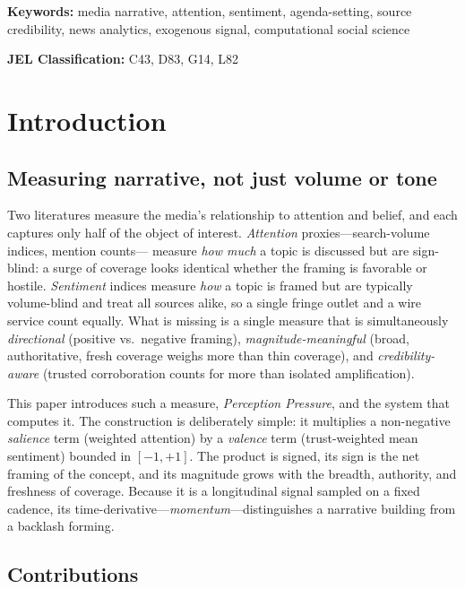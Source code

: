\documentclass[11pt,a4paper]{article}
\theoremstyle{definition}
\begin{document}
\smallskip
\noindent\textbf{Keywords:} media narrative, attention, sentiment, agenda-setting, source
credibility, news analytics, exogenous signal, computational social science

\smallskip
\noindent\textbf{JEL Classification:} C43, D83, G14, L82

\tableofcontents
\bigskip

\section{Introduction}
\label{sec:intro}

\subsection{Measuring narrative, not just volume or tone}

Two literatures measure the media's relationship to attention and belief, and each captures only
half of the object of interest. \emph{Attention} proxies---search-volume indices, mention counts---
measure \emph{how much} a topic is discussed but are sign-blind: a surge of coverage looks identical
whether the framing is favorable or hostile. \emph{Sentiment} indices measure \emph{how} a topic is
framed but are typically volume-blind and treat all sources alike, so a single fringe outlet and a
wire service count equally. What is missing is a single measure that is simultaneously
\emph{directional} (positive vs.\ negative framing), \emph{magnitude-meaningful} (broad, authoritative,
fresh coverage weighs more than thin coverage), and \emph{credibility-aware} (trusted corroboration
counts for more than isolated amplification).

This paper introduces such a measure, \emph{Perception Pressure}, and the system that computes it.
The construction is deliberately simple: it multiplies a non-negative \emph{salience} term (weighted
attention) by a \emph{valence} term (trust-weighted mean sentiment) bounded in $[-1,+1]$. The product
is signed, its sign is the net framing of the concept, and its magnitude grows with the breadth,
authority, and freshness of coverage. Because it is a longitudinal signal sampled on a fixed cadence,
its time-derivative---\emph{momentum}---distinguishes a narrative building from a backlash forming.

\subsection{Contributions}
\end{document}
